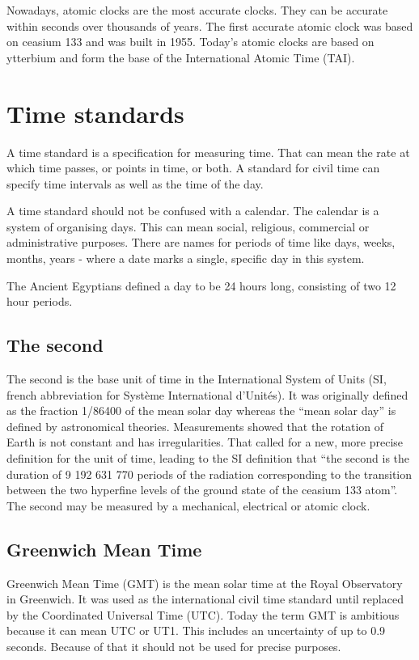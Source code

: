 Nowadays, atomic clocks are the most accurate clocks. They can be accurate within seconds over thousands of years. The first accurate atomic clock was based on ceasium 133 and was built in 1955. Today’s atomic clocks are based on ytterbium and form the base of the International Atomic Time (TAI).

\section{Time standards}

A time standard is a specification for measuring time. That can mean the rate at which time passes, or points in time, or both. A standard for civil time can specify time intervals as well as the time of the day.

A time standard should not be confused with a calendar. The calendar is a system of organising days. This can mean social, religious, commercial or administrative purposes. There are names for periods of time like days, weeks, months, years - where a date marks a single, specific day in this system.

The Ancient Egyptians defined a day to be 24 hours long, consisting of two 12 hour periods.

\subsection{The second}

The second is the base unit of time in the International System of Units (SI, french abbreviation for Système International d'Unités). It was originally defined as the fraction 1/86400 of the mean solar day whereas the “mean solar day” is defined by astronomical theories. Measurements showed that the rotation of Earth is not constant and has irregularities. That called for a new, more precise definition for the unit of time, leading to the SI definition that “the second is the duration of 9 192 631 770 periods of the radiation corresponding to the transition between the two hyperfine levels of the ground state of the ceasium 133 atom”.
The second may be measured by a mechanical, electrical or atomic clock.

\subsection{Greenwich Mean Time}

Greenwich Mean Time (GMT) is the mean solar time at the Royal Observatory in Greenwich. It was used as the international civil time standard until replaced by the Coordinated Universal Time (UTC). Today the term GMT is ambitious because it can mean UTC or UT1. This includes an uncertainty of up to 0.9 seconds. Because of that it should not be used for precise purposes.

